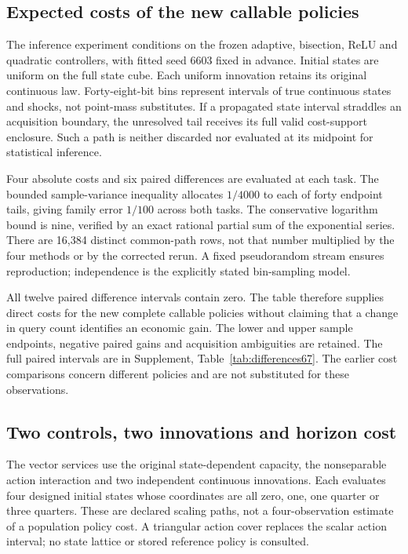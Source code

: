 \subsection{Expected costs of the new callable policies}

The inference experiment conditions on the frozen adaptive, bisection, ReLU and quadratic controllers, with fitted seed 6603 fixed in advance. Initial states are uniform on the full state cube. Each uniform innovation retains its original continuous law. Forty-eight-bit bins represent intervals of true continuous states and shocks, not point-mass substitutes. If a propagated state interval straddles an acquisition boundary, the unresolved tail receives its full valid cost-support enclosure. Such a path is neither discarded nor evaluated at its midpoint for statistical inference.

Four absolute costs and six paired differences are evaluated at each task. The bounded sample-variance inequality allocates $1/4000$ to each of forty endpoint tails, giving family error $1/100$ across both tasks. The conservative logarithm bound is nine, verified by an exact rational partial sum of the exponential series. There are 16,384 distinct common-path rows, not that number multiplied by the four methods or by the corrected rerun. A fixed pseudorandom stream ensures reproduction; independence is the explicitly stated bin-sampling model.

All twelve paired difference intervals contain zero. The table therefore supplies direct costs for the new complete callable policies without claiming that a change in query count identifies an economic gain. The lower and upper sample endpoints, negative paired gains and acquisition ambiguities are retained. The full paired intervals are in Supplement, Table~\ref{tab:differences67}. The earlier cost comparisons concern different policies and are not substituted for these observations.

\subsection{Two controls, two innovations and horizon cost}

The vector services use the original state-dependent capacity, the nonseparable action interaction and two independent continuous innovations. Each evaluates four designed initial states whose coordinates are all zero, one, one quarter or three quarters. These are declared scaling paths, not a four-observation estimate of a population policy cost. A triangular action cover replaces the scalar action interval; no state lattice or stored reference policy is consulted.

